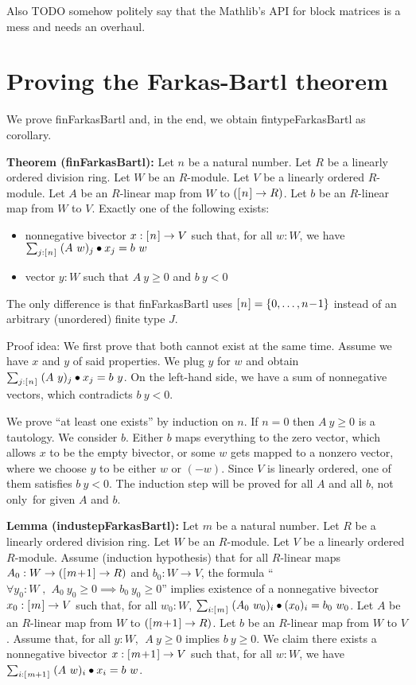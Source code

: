 \documentclass[]{article}
\renewcommand{\.}{\hskip .75pt}
\newcommand{\fin}[1]{[\.#1\.]}
\DeclareMathOperator{\st}{,\;}
\let\r=\rightarrow
\begin{document}
Also TODO somehow politely say that the Mathlib's API for block matrices
is a mess and needs an overhaul.


\section {Proving the Farkas-Bartl theorem}

We prove finFarkasBartl and, in the end, we obtain fintypeFarkasBartl as corollary.

\medskip \noindent
\textbf{Theorem (finFarkasBartl):}
Let $n$ be a natural number.
Let $R$ be a linearly ordered division ring.
Let $W$ be an $R$-module.
Let $V$ be a linearly ordered $R$-module.
Let $A$ be an $R$-linear map from $W$ to $(\fin{n} \r R)$.
Let $b$ be an $R$-linear map from $W$ to $V$.
Exactly one of the following exists:
\begin{itemize}
\item nonnegative bivector $x : \fin{n} \r V$ such that, for all $w : W$, we have
$ \sum_{j : \fin{n}}\; (A~w)_j \bullet x_j = b~w $
\item vector $y : W$ such that $A~y \ge 0$ and $b~y < 0$
\end{itemize}
The only difference is that finFarkasBartl uses $\fin{n} = \{ 0, \dots, n\!-\!1 \}$
instead of an arbitrary (unordered) finite type $J$.

\medskip \noindent
Proof idea:
We first prove that both cannot exist at the same time.
Assume we have $x$ and $y$ of said properties.
We plug $y$ for $w$ and obtain
$ \sum_{j : \fin{n}}\; (A~y)_j \bullet x_j = b~y $.
On the left-hand side, we have a sum of nonnegative vectors,
which contradicts $b~y < 0$.
\smallskip

We prove ``at least one exists'' by induction on $n$.
If $n=0$ then $A~y \ge 0$ is a tautology.
We consider $b$. Either $b$ maps everything to the
zero vector, which allows $x$ to be the empty bivector,
or some $w$ gets mapped to a nonzero vector, where
we choose $y$ to be either $w$ or $(-w)$.
Since $V$ is linearly ordered, one of them satisfies $b~y<0$.
The induction step will be proved for all $A$ and all $b$,
not only~for given $A$ and $b$.

\medskip \noindent
\textbf{Lemma (industepFarkasBartl):}
Let $m$ be a natural number.
Let $R$ be a linearly ordered division ring.
Let $W$ be an $R$-module.
Let $V$ be a linearly ordered $R$-module.
Assume (induction hypothesis) that
for all $R$-linear maps $A_0 : W \r (\fin{m\!+\!1} \r R)$
and $b_0 : W \r V$, the formula
``$\forall y_0 : W \st A_0~y_0 \ge 0 \implies b_0~y_0 \ge 0$''
implies existence of a nonnegative bivector $x_0 : \fin{m} \r V$ such that,
for all $w_0 : W$, $ \sum_{i : \fin{m}}\; (A_0~w_0)_i \bullet (x_0)_i = b_0~w_0 $.
Let $A$ be an $R$-linear map from $W$ to $(\fin{m\!+\!1} \r R)$.
Let $b$ be an $R$-linear map from $W$ to $V$.
Assume that, for all $y : W$, $\;A~y \ge 0$ implies $b~y \ge 0$.
We claim there exists a nonnegative bivector $x : \fin{m\!+\!1} \r V$
such that, for all $w : W$, we have
$ \sum_{i : \fin{m+1}}\; (A~w)_i \bullet x_i = b~w $.
\end{document}
